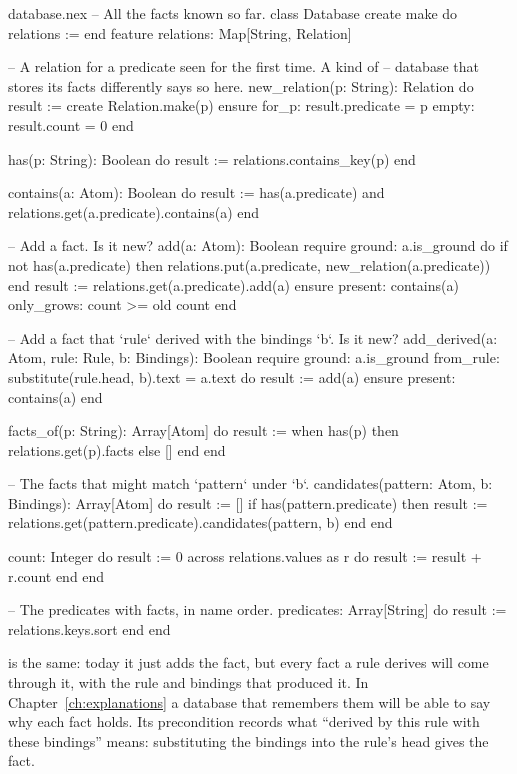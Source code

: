 \begin{continued}{database.nex}
-- All the facts known so far.
class Database
create
  make
  do
    relations := {}
  end
feature
  relations: Map[String, Relation]

  -- A relation for a predicate seen for the first time. A kind of
  -- database that stores its facts differently says so here.
  new_relation(p: String): Relation
  do
    result := create Relation.make(p)
  ensure
    for_p: result.predicate = p
    empty: result.count = 0
  end

  has(p: String): Boolean
  do
    result := relations.contains_key(p)
  end

  contains(a: Atom): Boolean
  do
    result := has(a.predicate) and relations.get(a.predicate).contains(a)
  end

  -- Add a fact. Is it new?
  add(a: Atom): Boolean
  require
    ground: a.is_ground
  do
    if not has(a.predicate) then
      relations.put(a.predicate, new_relation(a.predicate))
    end
    result := relations.get(a.predicate).add(a)
  ensure
    present: contains(a)
    only_grows: count >= old count
  end

  -- Add a fact that `rule` derived with the bindings `b`. Is it new?
  add_derived(a: Atom, rule: Rule, b: Bindings): Boolean
  require
    ground: a.is_ground
    from_rule: substitute(rule.head, b).text = a.text
  do
    result := add(a)
  ensure
    present: contains(a)
  end

  facts_of(p: String): Array[Atom]
  do
    result := when has(p) then relations.get(p).facts else [] end
  end

  -- The facts that might match `pattern` under `b`.
  candidates(pattern: Atom, b: Bindings): Array[Atom]
  do
    result := []
    if has(pattern.predicate) then
      result := relations.get(pattern.predicate).candidates(pattern, b)
    end
  end

  count: Integer
  do
    result := 0
    across relations.values as r do
      result := result + r.count
    end
  end

  -- The predicates with facts, in name order.
  predicates: Array[String]
  do
    result := relations.keys.sort
  end
end
\end{continued}

 is the same: today it just adds the fact, but every fact
a rule derives will come through it, with the rule and bindings that
produced it. In Chapter~\ref{ch:explanations} a database that remembers
them will be able to say why each fact holds. Its precondition
 records what ``derived by this rule with these bindings''
means: substituting the bindings into the rule's head gives the fact.

